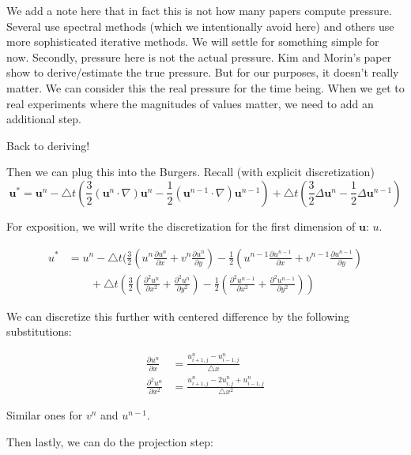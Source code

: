 \documentclass[12pt]{article}
\begin{document}
We add a note here that in fact this is not how many papers compute pressure. Several use spectral methods (which we intentionally avoid here) and others use more sophisticated iterative methods. We will settle for something simple for now. Secondly, pressure here is not the actual pressure. Kim and Morin's paper show to derive/estimate the true pressure. But for our purposes, it doesn't really matter. We can consider this the real pressure for the time being. When we get to real experiments where the magnitudes of values matter, we need to add an additional step.

Back to deriving!

Then we can plug this into the Burgers. Recall (with explicit discretization)
\begin{equation}
    \mathbf{u}^* = \mathbf{u}^n - \bigtriangleup t (\frac{3}{2}(\mathbf{u}^n \cdot \nabla)\mathbf{u}^n - \frac{1}{2}(\mathbf{u}^{n-1} \cdot \nabla)\mathbf{u}^{n-1}) + \bigtriangleup t (\frac{3}{2}\Delta \mathbf{u}^n - \frac{1}{2} \Delta \mathbf{u}^{n-1})
\end{equation}

For exposition, we will write the discretization for the first dimension of $\mathbf{u}$: $u$.

\begin{align*}
u^* &= u^n - \bigtriangleup t (\frac{3}{2}(u^n\frac{\partial u^n}{\partial x} + v^n \frac{\partial u^n}{\partial y}) - \frac{1}{2}(u^{n-1}\frac{\partial u^{n-1}}{\partial x} + v^{n-1} \frac{\partial u^{n-1}}{\partial y}) \\
    &\qquad + \bigtriangleup t (\frac{3}{2}(\frac{\partial^2 u^n}{\partial x^2} + \frac{\partial^2 u^n}{\partial y^2}) - \frac{1}{2}(\frac{\partial^2 u^{n-1}}{\partial x^2} + \frac{\partial^2 u^{n-1}}{\partial y^2}))
\end{align*}

We can discretize this further with centered difference by the following substitutions:

\begin{align*}
    \frac{\partial u^n}{\partial x} &= \frac{u^n_{i+1,j} - u^n_{i-1,j}}{\bigtriangleup x} \\
    \frac{\partial^2 u^n}{\partial x^2} &= \frac{u^n_{i+1,j} - 2u^n_{i,j} + u^n_{i-1,j}}{\bigtriangleup x^2}
\end{align*}

Similar ones for $v^n$ and $u^{n-1}$.

Then lastly, we can do the projection step:
\end{document}
